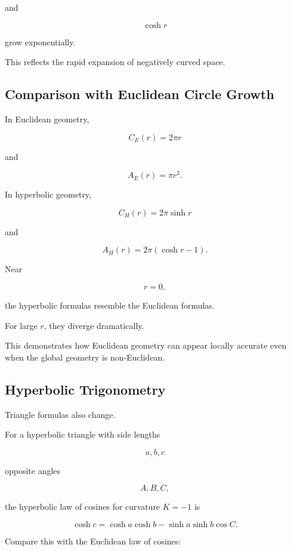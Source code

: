 and

\[
\cosh r
\]

grow exponentially.

This reflects the rapid expansion of negatively curved space.

\subsection{Comparison with Euclidean Circle Growth}
\label{subsec:circle-growth-comparison}

In Euclidean geometry,

\[
C_E(r)=2\pi r
\]

and

\[
A_E(r)=\pi r^2.
\]

In hyperbolic geometry,

\[
C_H(r)=2\pi\sinh r
\]

and

\[
A_H(r)=2\pi(\cosh r-1).
\]

Near

\[
r=0,
\]

the hyperbolic formulas resemble the Euclidean formulas.

For large \(r\), they diverge dramatically.

This demonstrates how Euclidean geometry can appear locally accurate even
when the global geometry is non-Euclidean.

\subsection{Hyperbolic Trigonometry}
\label{subsec:hyperbolic-trigonometry}

Triangle formulas also change.

For a hyperbolic triangle with side lengths

\[
a,b,c
\]

opposite angles

\[
A,B,C,
\]

the hyperbolic law of cosines for curvature \(K=-1\) is

\[
\boxed{
\cosh c
=
\cosh a\cosh b
-
\sinh a\sinh b\cos C.
}
\]

Compare this with the Euclidean law of cosines:

